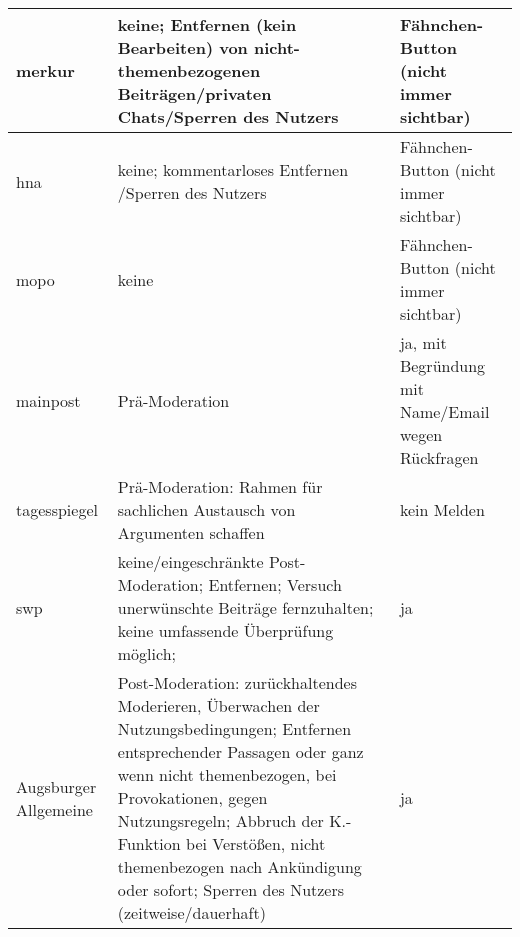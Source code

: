 \begin{landscape}
\begin{longtable}{l|p{110mm}p{50mm}}
merkur &
  keine; Entfernen (kein Bearbeiten) von nicht-themenbezogenen
  Beiträgen/privaten Chats/Sperren des Nutzers &
  Fähnchen-Button (nicht immer sichtbar) \\\hline

hna &
  keine; kommentarloses Entfernen /Sperren des Nutzers &
  Fähnchen-Button (nicht immer sichtbar) \\\hline

mopo &
  keine & Fähnchen-Button (nicht immer sichtbar) \\\hline

mainpost &
  Prä-Moderation &
  ja, mit Begründung mit Name/Email wegen Rückfragen \\\hline

tagesspiegel &
  Prä-Moderation: Rahmen für sachlichen Austausch von Argumenten schaffen &
  kein Melden \\\hline

swp &
  keine/eingeschränkte Post-Moderation; Entfernen; Versuch unerwünschte
  Beiträge fernzuhalten; keine umfassende Überprüfung möglich; &
  ja \\\hline

Augsburger Allgemeine &
  Post-Moderation: zurückhaltendes Moderieren, Überwachen der
  Nutzungsbedingungen; Entfernen entsprechender Passagen oder ganz wenn nicht
  themenbezogen, bei Provokationen, gegen Nutzungsregeln; Abbruch der
  K.-Funktion bei Verstößen, nicht themenbezogen nach Ankündigung oder sofort;
  Sperren  des Nutzers (zeitweise/dauerhaft) &
  ja \\

\end{longtable}
\end{landscape}

